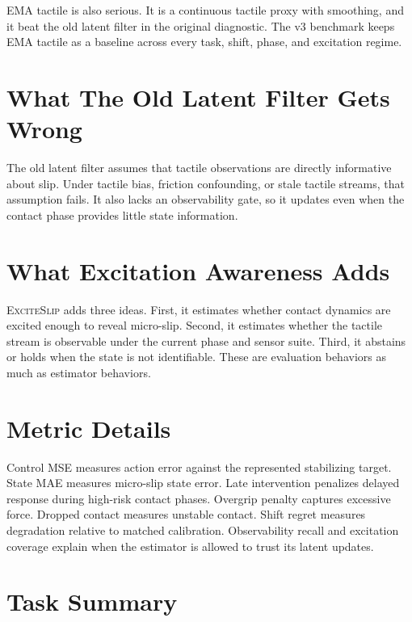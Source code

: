 \documentclass{article}
\newcommand{\method}{\textsc{ExciteSlip}\xspace}
\begin{document}
EMA tactile is also serious. It is a continuous tactile proxy with smoothing, and it beat the old latent filter in the original diagnostic. The v3 benchmark keeps EMA tactile as a baseline across every task, shift, phase, and excitation regime.

\section{What The Old Latent Filter Gets Wrong}

The old latent filter assumes that tactile observations are directly informative about slip. Under tactile bias, friction confounding, or stale tactile streams, that assumption fails. It also lacks an observability gate, so it updates even when the contact phase provides little state information.

\section{What Excitation Awareness Adds}

\method adds three ideas. First, it estimates whether contact dynamics are excited enough to reveal micro-slip. Second, it estimates whether the tactile stream is observable under the current phase and sensor suite. Third, it abstains or holds when the state is not identifiable. These are evaluation behaviors as much as estimator behaviors.

\section{Metric Details}

Control MSE measures action error against the represented stabilizing target. State MAE measures micro-slip state error. Late intervention penalizes delayed response during high-risk contact phases. Overgrip penalty captures excessive force. Dropped contact measures unstable contact. Shift regret measures degradation relative to matched calibration. Observability recall and excitation coverage explain when the estimator is allowed to trust its latent updates.

\section{Task Summary}

\begin{table}[t]
\centering
\caption{Task-family summary for the excitation-aware protocol.}
\resizebox{\linewidth}{!}{}
\end{table}
\end{document}
